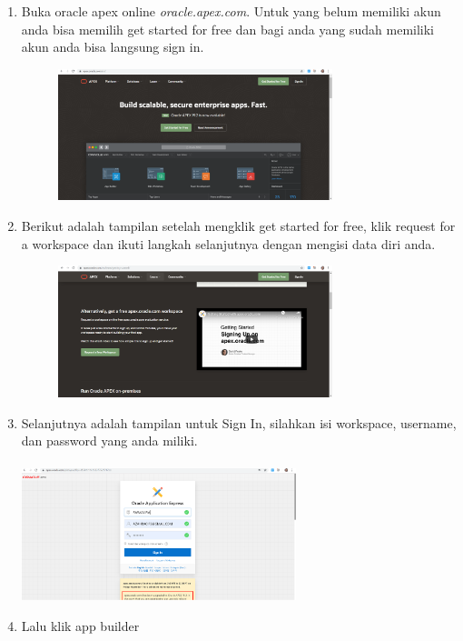 \begin{enumerate}
\begin{figure}[ht]
    \end{figure}
    \item Buka oracle apex online \textit{oracle.apex.com}. Untuk yang belum memiliki akun anda bisa memilih get started for free dan bagi anda yang sudah memiliki akun anda bisa langsung sign in.
        \begin{figure}[h]
        \centerline{\includegraphics[width=8cm]{GAMBAR/getstarted.PNG}}
        \end{figure}
    \item Berikut adalah tampilan setelah mengklik get started for free, klik request for a workspace dan ikuti langkah selanjutnya dengan mengisi data diri anda.
        \begin{figure}[h]
        \centerline{\includegraphics[width=8cm]{GAMBAR/requestws.PNG}}
        \end{figure}
    \item Selanjutnya adalah tampilan untuk Sign In, silahkan isi workspace, username, dan password yang anda miliki.
        \paragraph{}
        \centerline{\includegraphics[width=8cm]{GAMBAR/SIGNIN2.PNG}}
    \item Lalu klik app builder

\end{enumerate}
